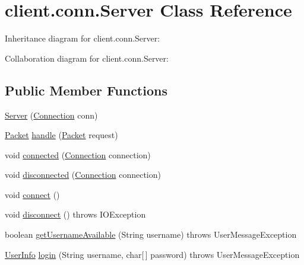 \hypertarget{classclient_1_1conn_1_1_server}{}\section{client.\+conn.\+Server Class Reference}
\label{classclient_1_1conn_1_1_server}


Inheritance diagram for client.\+conn.\+Server\+:


Collaboration diagram for client.\+conn.\+Server\+:
\subsection*{Public Member Functions}
\begin{DoxyCompactItemize}
\item 
\hyperlink{classclient_1_1conn_1_1_server_aea9f06e94bc3d3653c06b192ba097a14}{Server} (\hyperlink{classpt_1_1up_1_1fe_1_1lpro1613_1_1sharedlib_1_1conn_1_1_connection}{Connection} conn)
\item 
\hyperlink{classpt_1_1up_1_1fe_1_1lpro1613_1_1sharedlib_1_1conn_1_1_packet}{Packet} \hyperlink{classclient_1_1conn_1_1_server_a620def50e5115d3798407dfff5433ead}{handle} (\hyperlink{classpt_1_1up_1_1fe_1_1lpro1613_1_1sharedlib_1_1conn_1_1_packet}{Packet} request)
\item 
void \hyperlink{classclient_1_1conn_1_1_server_ac8ad09c9052bfb32e082493ada8d14ab}{connected} (\hyperlink{classpt_1_1up_1_1fe_1_1lpro1613_1_1sharedlib_1_1conn_1_1_connection}{Connection} connection)
\item 
void \hyperlink{classclient_1_1conn_1_1_server_ae2a0ab226b1622da8e19137fb89bdc81}{disconnected} (\hyperlink{classpt_1_1up_1_1fe_1_1lpro1613_1_1sharedlib_1_1conn_1_1_connection}{Connection} connection)
\item 
void \hyperlink{classclient_1_1conn_1_1_server_a7e96a6bd486520d128a37a8216cf37c3}{connect} ()
\item 
void \hyperlink{classclient_1_1conn_1_1_server_ab69a81693f41986321e92120aa0918cb}{disconnect} ()  throws I\+O\+Exception 
\item 
boolean \hyperlink{classclient_1_1conn_1_1_server_ab25d4a9f33372c404d2464d1b608dd77}{get\+Username\+Available} (String username)  throws User\+Message\+Exception 
\item 
\hyperlink{classpt_1_1up_1_1fe_1_1lpro1613_1_1sharedlib_1_1tuples_1_1_user_info}{User\+Info} \hyperlink{classclient_1_1conn_1_1_server_a064556a987ee40eb0a91a952ae08969f}{login} (String username, char\mbox{[}$\,$\mbox{]} password)  throws User\+Message\+Exception 

\end{DoxyCompactItemize}
